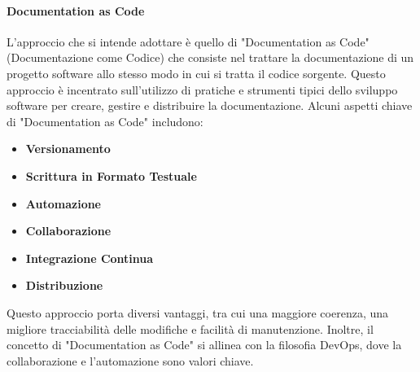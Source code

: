 \paragraph{Documentation as Code}\label{sec:DocumentationAscode}
L'approccio che si intende adottare è quello di "Documentation as Code" (Documentazione come Codice) che consiste nel trattare la documentazione di un progetto software allo stesso modo in cui si tratta il codice sorgente. Questo approccio è incentrato sull'utilizzo di pratiche e strumenti tipici dello sviluppo software per creare, gestire e distribuire la documentazione.
Alcuni aspetti chiave di "Documentation as Code" includono:
\begin{itemize}
    \item \textbf{Versionamento}
    \item \textbf{Scrittura in Formato Testuale}
    \item \textbf{Automazione}
    \item \textbf{Collaborazione}
    \item \textbf{Integrazione Continua}
    \item \textbf{Distribuzione}
\end{itemize}
Questo approccio porta diversi vantaggi, tra cui una maggiore coerenza, una migliore tracciabilità delle modifiche e facilità di manutenzione. Inoltre, il concetto di "Documentation as Code" si allinea con la filosofia DevOps, dove la collaborazione e l'automazione sono valori chiave.\\

